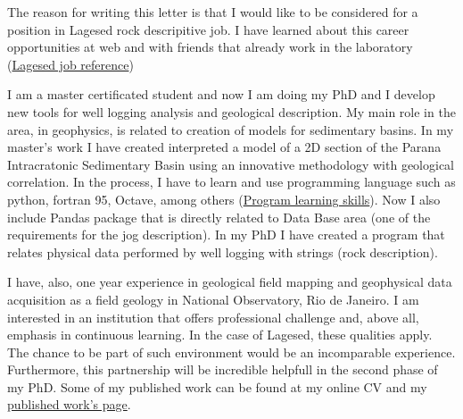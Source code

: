 \documentclass[5pt,stdletter,dateno,sigleft]{newlfm} %
\begin{document}
\begin{newlfm}


The reason for writing this letter is that I would like to be considered for a position in Lagesed rock descripitive job. I have learned about this career opportunities at web and with friends that already work in the laboratory (\href{http://lagesed.geologia.ufrj.br/presal-bacia-de-santos/}{Lagesed job reference})


I am a master certificated student and now I am doing my PhD and I develop new tools for well logging analysis and geological description. My main role in the area, in geophysics, is related to creation of models for sedimentary basins. In my master's work I have created interpreted a model of a 2D section of the Parana Intracratonic Sedimentary Basin using an innovative methodology with geological correlation. In the process, I have to learn and use programming language such as python, fortran 95, Octave, among others (\href{https://github.com/VictorCarreira}{Program learning skills}). Now I also include Pandas package that is directly related to Data Base area (one of the requirements for the jog description). In my PhD I have created a program that relates physical data performed by well logging with strings (rock description). 

I have, also, one year experience in geological field mapping and geophysical data acquisition as a field geology in National Observatory, Rio de Janeiro. I am interested in an institution that offers professional challenge and, above all, emphasis in continuous learning. In the case of Lagesed, these qualities apply. The chance to be part of such environment would be an incomparable experience. Furthermore, this partnership will be incredible helpfull in the second phase of my PhD. Some of my published work can be found at my online CV and my \href{https://www.researchgate.net/profile/Victor_Carreira}{published work's page}.



\end{newlfm}
\end{document}
